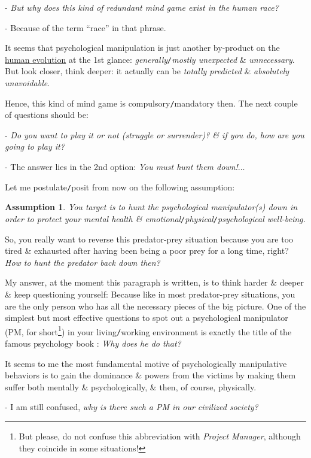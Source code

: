 \documentclass[12pt,twoside]{book}
\newtheorem{assumption}{Assumption}
\begin{document}
- {\it But why does this kind of redundant mind game exist in the human race?}

- Because of the term ``race'' in that phrase.

It seems that psychological manipulation is just another by-product on the \href{https://en.wikipedia.org/wiki/Human_evolution}{human evolution} at the 1st glance: {\it generally{\tt/}mostly unexpected} \& {\it unnecessary}. But look closer, think deeper: it actually can be {\it totally predicted} \& {\it absolutely unavoidable}.

Hence, this kind of mind game is compulsory{\tt/}mandatory then. The next couple of questions should be:

- {\it Do you want to play it or not (struggle or surrender)? \& if you do, how are you going to play it?}

- The answer lies in the 2nd option: {\it You must hunt them down!$\ldots$}

Let me postulate{\tt/}posit from now on the following assumption:

\begin{assumption}
	You target is to hunt the psychological manipulator(s) down in order to protect your mental health \& emotional{\tt/}physical{\tt/}psychological well-being.
\end{assumption}
So, you really want to reverse this predator-prey situation because you are too tired \& exhausted after having been being a poor prey for a long time, right? {\it How to hunt the predator back down then?}

My answer, at the moment this paragraph is written, is to think harder \& deeper \& keep questioning yourself: Because like in most predator-prey situations, you are the only person who has all the necessary pieces of the big picture. One of the simplest but most effective questions to spot out a psychological manipulator (PM, for short\footnote{But please, do not confuse this abbreviation with {\it Project Manager}, although they coincide in some situations!}) in your living{\tt/}working environment is exactly the title of the famous psychology book \cite{Bancroft_why_he_do,Bancroft_why_he_do_VN}: {\it Why does he do that?}

It seems to me the most fundamental motive of psychologically manipulative behaviors is to gain the dominance \& powers from the victims by making them suffer both mentally \& psychologically, \& then, of course, physically. 

- I am still confused, {\it why is there such a PM in our civilized society?}
\end{document}
